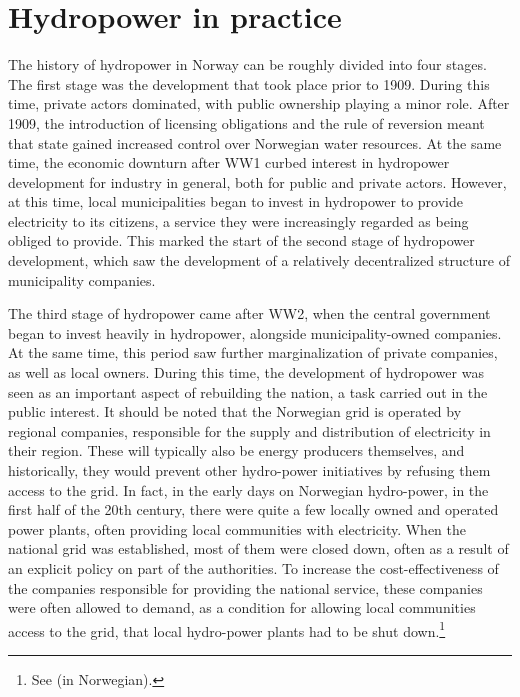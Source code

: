 \section{Hydropower in practice}

The history of hydropower in Norway can be roughly divided into four stages. The first stage was the development that took place prior to 1909. During this time, private actors dominated, with public ownership playing a minor role. After 1909, the introduction of licensing obligations and the rule of reversion meant that state gained increased control over Norwegian water resources. At the same time, the economic downturn after WW1 curbed interest in hydropower development for industry in general, both for public and private actors. However, at this time, local municipalities began to invest in hydropower to provide electricity to its citizens, a service they were increasingly regarded as being obliged to provide. This marked the start of the second stage of hydropower development, which saw the development of a relatively decentralized structure of municipality companies. 

The third stage of hydropower came after WW2, when the central government began to invest heavily in hydropower, alongside municipality-owned companies.  At the same time, this period saw further marginalization of private companies, as well as local owners. During this time, the development of hydropower was seen as an important aspect of rebuilding the nation, a task carried out in the public interest. It should be noted that the Norwegian grid is operated by regional companies, responsible for the supply and distribution of electricity in their region. These will typically also be energy producers themselves, and historically, they would prevent other hydro-power initiatives by refusing them access to the grid. In fact, in the early days on Norwegian hydro-power, in the first half of the 20th century, there were quite a few locally owned and operated power plants, often providing local communities with electricity. When the national grid was established, most of them were closed down, often as a result of an explicit policy on part of the authorities. To increase the cost-effectiveness of the companies responsible for providing the national service, these companies were often allowed to demand, as a condition for allowing local communities access to the grid, that local hydro-power plants had to be shut down.\footnote{See \cite[p.111]{Hindrum} (in Norwegian).}

